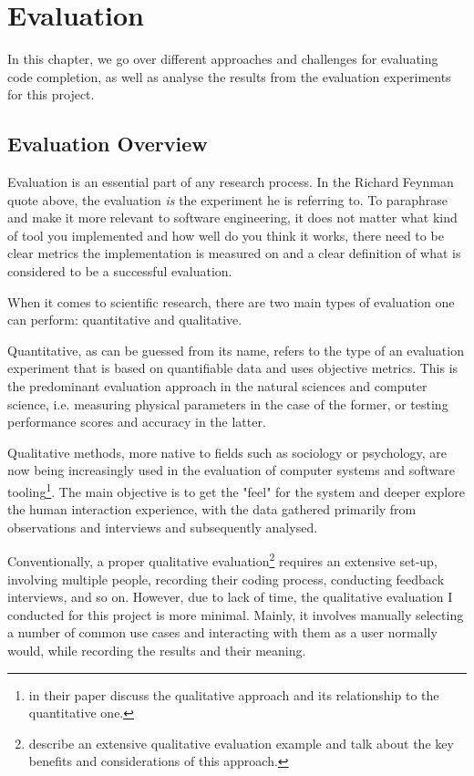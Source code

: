 \documentclass[sigplan,screen]{acmart}
\begin{document}
\section{Evaluation}
In this chapter, we go over different approaches and challenges for evaluating code completion, as well as analyse the results from the evaluation experiments for this project.

\subsection{Evaluation Overview}
Evaluation is an essential part of any research process. In the Richard Feynman quote above, the evaluation \textit{is} the experiment he is referring to. To paraphrase and make it more relevant to software engineering, it does not matter what kind of tool you implemented and how well do you think it works, there need to be clear metrics the implementation is measured on and a clear definition of what is considered to be a successful evaluation.

When it comes to scientific research, there are two main types of evaluation one can perform: quantitative and qualitative.

Quantitative, as can be guessed from its name, refers to the type of an evaluation experiment that is based on quantifiable data and uses objective metrics. This is the predominant evaluation approach in the natural sciences and computer science, i.e. measuring physical parameters in the case of the former, or testing performance scores and accuracy in the latter.

Qualitative methods, more native to fields such as sociology or psychology, are now being increasingly used in the evaluation of computer systems and software tooling\footnote{\cite{Hazz06a} in their paper discuss the qualitative approach and its relationship to the quantitative one.}. The main objective is to get the "feel" for the system and deeper explore the human interaction experience, with the data gathered primarily from observations and interviews and subsequently analysed.

Conventionally, a proper qualitative evaluation\footnote{\cite{Kapl05a} describe an extensive qualitative evaluation example and talk about the key benefits and considerations of this approach.} requires an extensive set-up, involving multiple people, recording their coding process, conducting feedback interviews, and so on. However, due to lack of time, the qualitative evaluation I conducted for this project is more minimal. Mainly, it involves manually selecting a number of common use cases and interacting with them as a user normally would, while recording the results and their meaning.
\end{document}

